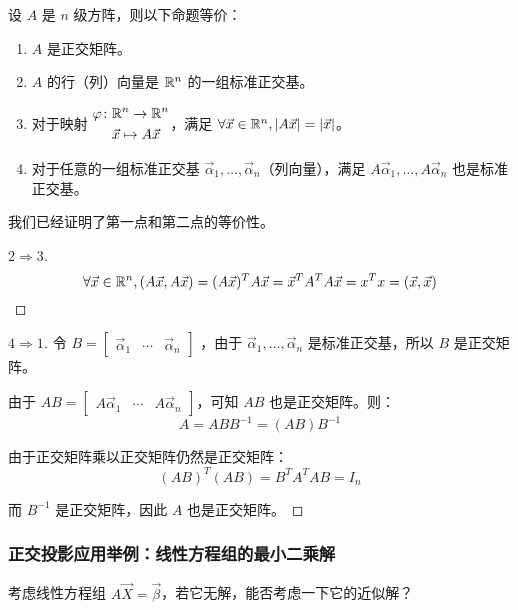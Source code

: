 \begin{theorem}
	设 $A$ 是 $n$ 级方阵，则以下命题等价：
	\begin{enumerate}
		\item $A$ 是正交矩阵。
		\item $A$ 的行（列）向量是 $\mathbb R^n$ 的一组标准正交基。
		\item 对于映射 $\begin{aligned} \varphi \colon & \mathbb R^n \to \mathbb R^n \\ & \vec x \mapsto A \vec x \end{aligned}$，满足 $\forall \vec x \in \mathbb R^n, |A \vec x| = |\vec x|$。
		\item 对于任意的一组标准正交基 $\vec \alpha_1, \ldots, \vec \alpha_n$（列向量），满足 $A \vec \alpha_1, \ldots, A \vec \alpha_n$ 也是标准正交基。
	\end{enumerate}
\end{theorem}

我们已经证明了第一点和第二点的等价性。

\begin{proof}[$2 \Longrightarrow 3$]
	$$
	\forall \vec x \in \mathbb R^n, (A \vec x, A \vec x) = (A\vec x)^T A \vec x = \vec x^T A^T A \vec x = x^T x = (\vec x, \vec x)
	$$
\end{proof}

\begin{proof}[$4 \Longrightarrow 1$]
	令 $B = \begin{bmatrix} \vec \alpha_1 & \cdots & \vec \alpha_n \end{bmatrix}$ ，由于 $\vec \alpha_1, \ldots, \vec \alpha_n$ 是标准正交基，所以 $B$ 是正交矩阵。

	由于 $AB = \begin{bmatrix} A \vec \alpha_1 & \cdots & A \vec \alpha_n \end{bmatrix}$，可知 $AB$ 也是正交矩阵。则：
	$$
	A = ABB^{-1} = (AB) B^{-1}
	$$

	由于正交矩阵乘以正交矩阵仍然是正交矩阵：
	$$
	(AB)^T(AB) = B^TA^TAB = I_n
	$$

	而 $B^{-1}$ 是正交矩阵，因此 $A$ 也是正交矩阵。
\end{proof}

\subsubsection{正交投影应用举例：线性方程组的最小二乘解}

考虑线性方程组 $A \vec X = \vec \beta$，若它无解，能否考虑一下它的近似解？

